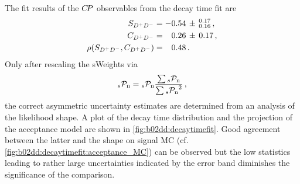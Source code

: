 The fit results of the ${C\!P}$ observables from the decay time fit are
\begin{align}
\begin{split}
  S_{{{D}^+}{{D}^-}}                &= -0.54\,\pm\,^{0.17}_{0.16} \, , \\
  C_{{{D}^+}{{D}^-}}                &= \phantom{-}0.26\,\pm\,0.17 \, , \\
  \rho(S_{{{D}^+}{{D}^-}},C_{{{D}^+}{{D}^-}})     &= \phantom{-}0.48 \, . \\
\end{split}
\label{eq:b02dd:decaytimefit:cpresults}
\end{align}
Only after rescaling the sWeights via
\begin{align}
  _{s}\mathcal{P}_\text{n} = \mbox{\ensuremath{_{s}\mathcal{P}_\text{n}}} \frac{\sum \mbox{\ensuremath{_{s}\mathcal{P}_\text{n}}}}{\sum \mbox{\ensuremath{_{s}\mathcal{P}_\text{n}}}^2}\,,
\end{align}
the correct asymmetric uncertainty estimates are determined from an analysis
of the likelihood shape. A plot of the decay time distribution and the
projection of the acceptance model are shown in \cref{fig:b02dd:decaytimefit}.
Good agreement between the latter and the shape on signal MC (cf.
\cref{fig:b02dd:decaytimefit:acceptance_MC}) can be observed but the low
statistics leading to rather large uncertainties indicated by the error band
diminishes the significance of the comparison.

